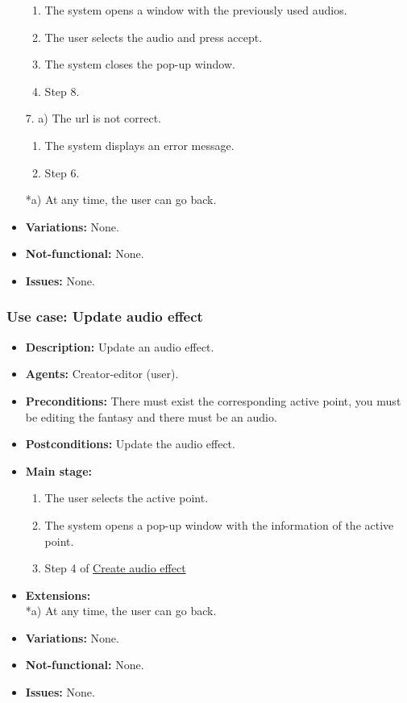 \begin{itemize}
\begin{enumerate}
		\item The system opens a window with the previously used audios.
		\item The user selects the audio and press accept.
		\item The system closes the pop-up window.
		\item Step 8.
	\end{enumerate}
	7. a) The url is not correct.
	\begin{enumerate}
		\item The system displays an error message.
		\item Step 6.
	\end{enumerate}
	*a) At any time, the user can go back.
	\item \textbf{Variations:} None.
	\item \textbf{Not-functional:} None.
	\item \textbf{Issues:} None.
\end{itemize}

\subsubsection{Use case: Update audio effect}
\begin{itemize}
	\item \textbf{Description:} Update an audio effect.
	\item \textbf{Agents:} Creator-editor (user).
	\item \textbf{Preconditions:} There must exist the corresponding active point, you must be editing the fantasy and there must be an audio.
	\item \textbf{Postconditions:} Update the audio effect.
	\item \textbf{Main stage:}
	\begin{enumerate}
		\item The user selects the active point.
		\item The system opens a pop-up window with the information of the active point.
		\item Step 4 of \hyperlink{crearaudio}{Create audio effect}
	\end{enumerate}
	\item \textbf{Extensions:} \\ *a) At any time, the user can go back.
	\item \textbf{Variations:} None.
	\item \textbf{Not-functional:} None.
	\item \textbf{Issues:} None.
\end{itemize}

